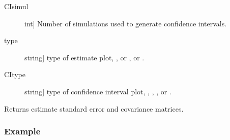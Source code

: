 \documentclass[letterpaper,10pt,english]{sphinxmanual}
\begin{document}
\begin{fulllineitems}
\begin{fulllineitems}
\begin{description}
\item[{CIsimul}] \leavevmode{[}int{]}
\sphinxAtStartPar
Number of simulations used to generate confidence intervals.

\item[{type}] \leavevmode{[}string{]}
\sphinxAtStartPar
type of estimate plot, , or , or .

\item[{CItype}] \leavevmode{[}string{]}
\sphinxAtStartPar
type of confidence interval plot, , , , or .

\end{description}

\end{fulllineitems}


\begin{fulllineitems}
\label{\detokenize{lpdensity:lpdensity.lpdensity.lpdensity_output.vcov}}
\pysigstartsignatures
{}
\pysigstopsignatures
\sphinxAtStartPar
Returns estimate standard error and covariance matrices.

\end{fulllineitems}


\end{fulllineitems}



\subsubsection{Example}
\label{\detokenize{lpdensity:example}}
\begin{sphinxVerbatim}[commandchars=\\\{\}]
   
   
  
    
   
\end{sphinxVerbatim}
\end{document}
